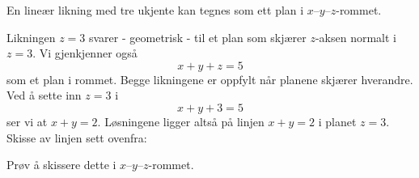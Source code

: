 \begin{losning}

\begin{punkt}
En lineær likning med tre ukjente kan tegnes som ett plan i $x$--$y$--$z$-rommet.
\end{punkt}
\begin{punkt}
Likningen $z=3$ svarer - geometrisk - til et plan som skjærer $z$-aksen normalt i $z=3$. Vi gjenkjenner også $$x+y+z=5$$ som et plan i rommet. Begge likningene er oppfylt når planene skjærer hverandre. Ved å sette inn $z=3$ i $$x+y+3=5$$ ser vi at $x+y=2$. Løsningene ligger altså på linjen $x+y=2$ i planet $z=3$. Skisse av linjen sett ovenfra:
\newline
Prøv å skissere dette i $x$--$y$--$z$-rommet.
\end{punkt}
\end{losning}
